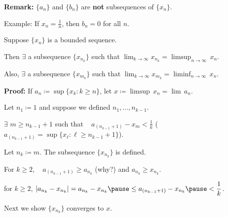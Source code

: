 \documentclass[10pt,aspectratio=149]{beamer}
\begin{document}
\begin{frame}

\textbf{Remark:} $\{ a_n \}$ and $\{b_n\}$ are \textbf{not} subsequences of $\{x_n\}$.

\pause
Example: If $x_n = \frac{1}{n}$, then $b_n = 0$ for all $n$.

\pause
\begin{theorem}
Suppose $\{ x_n \}$ is a bounded sequence.

\pause
Then $\exists$ a subsequence $\{ x_{n_k} \}$ such that
\quad
$\displaystyle \lim_{k\to \infty} x_{n_k} = \limsup_{n \to \infty} \, x_n$.

\pause
Also, $\exists$ a subsequence
$\{ x_{m_k} \}$ such that
\quad
$\displaystyle 
\lim_{k\to \infty} x_{m_k} = \liminf_{n \to \infty} \, x_n$.
\end{theorem}

\pause
\textbf{Proof:}
If $a_n \coloneqq \sup \{ x_k : k \geq n \}$, let $x \coloneqq \limsup \, x_n = \lim\, a_n$.

\pause
Let $n_1 \coloneqq 1$ and suppose we defined $n_1,\ldots,n_{k-1}$.

\pause
$\exists$ $m \geq n_{k-1} + 1$ such that
~ $\displaystyle a_{(n_{k-1}+1)} - x_m < \frac{1}{k}$
\quad ($a_{(n_{k-1}+1)} = \sup \{ x_\ell : \ell \geq n_{k-1} + 1 \}$).

\pause
\medskip

Let $n_{k} \coloneqq  m$.  The subsequence $\{ x_{n_k} \}$ is defined.

\pause
\medskip

For $k \geq 2$, ~ $a_{(n_{k-1}+1)} \geq a_{n_k}$ (why?) and $a_{n_{k}} \geq x_{n_k}$.

\pause
\thus \quad for $k \geq 2$,
\quad $\displaystyle \abs{a_{n_k} - x_{n_k}} = 
a_{n_k} - x_{n_k}
\pause
\leq
a_{(n_{k-1}+1)} - x_{n_k}
\pause
< \frac{1}{k}$.

\pause
\medskip

Next we show $\{ x_{n_k} \}$ converges to $x$.

\end{frame}
\end{document}
